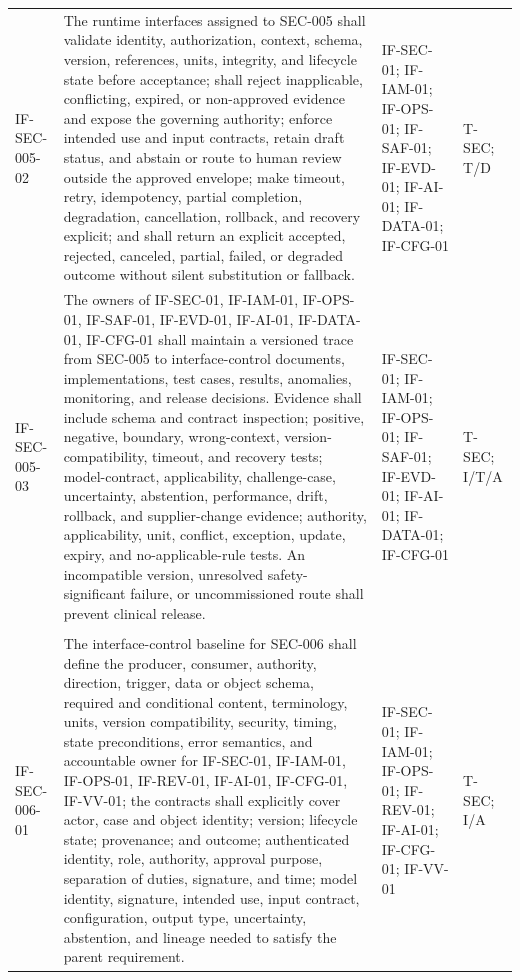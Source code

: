 \documentclass[11pt,letterpaper]{article}
\begin{document}
\begin{scriptsize}
\begin{longtable}{@{}L{0.14\textwidth}L{0.49\textwidth}L{0.19\textwidth}L{0.10\textwidth}@{}}
\addlinespace[2pt]
\mbox{IF-SEC-005-02} & The runtime interfaces assigned to SEC-005 shall validate identity, authorization, context, schema, version, references, units, integrity, and lifecycle state before acceptance; shall reject inapplicable, conflicting, expired, or non-approved evidence and expose the governing authority; enforce intended use and input contracts, retain draft status, and abstain or route to human review outside the approved envelope; make timeout, retry, idempotency, partial completion, degradation, cancellation, rollback, and recovery explicit; and shall return an explicit accepted, rejected, canceled, partial, failed, or degraded outcome without silent substitution or fallback. & IF-SEC-01; IF-IAM-01; IF-OPS-01; IF-SAF-01; IF-EVD-01; IF-AI-01; IF-DATA-01; IF-CFG-01 & T-SEC; T\slash\allowbreak{}D \\
\addlinespace[2pt]
\mbox{IF-SEC-005-03} & The owners of IF-SEC-01, IF-IAM-01, IF-OPS-01, IF-SAF-01, IF-EVD-01, IF-AI-01, IF-DATA-01, IF-CFG-01 shall maintain a versioned trace from SEC-005 to interface-control documents, implementations, test cases, results, anomalies, monitoring, and release decisions. Evidence shall include schema and contract inspection; positive, negative, boundary, wrong-context, version-compatibility, timeout, and recovery tests; model-contract, applicability, challenge-case, uncertainty, abstention, performance, drift, rollback, and supplier-change evidence; authority, applicability, unit, conflict, exception, update, expiry, and no-applicable-rule tests. An incompatible version, unresolved safety-significant failure, or uncommissioned route shall prevent clinical release. & IF-SEC-01; IF-IAM-01; IF-OPS-01; IF-SAF-01; IF-EVD-01; IF-AI-01; IF-DATA-01; IF-CFG-01 & T-SEC; I\slash\allowbreak{}T\slash\allowbreak{}A \\
\addlinespace[2pt]
 \\
\addlinespace[2pt]
\mbox{IF-SEC-006-01} & The interface-control baseline for SEC-006 shall define the producer, consumer, authority, direction, trigger, data or object schema, required and conditional content, terminology, units, version compatibility, security, timing, state preconditions, error semantics, and accountable owner for IF-SEC-01, IF-IAM-01, IF-OPS-01, IF-REV-01, IF-AI-01, IF-CFG-01, IF-VV-01; the contracts shall explicitly cover actor, case and object identity; version; lifecycle state; provenance; and outcome; authenticated identity, role, authority, approval purpose, separation of duties, signature, and time; model identity, signature, intended use, input contract, configuration, output type, uncertainty, abstention, and lineage needed to satisfy the parent requirement. & IF-SEC-01; IF-IAM-01; IF-OPS-01; IF-REV-01; IF-AI-01; IF-CFG-01; IF-VV-01 & T-SEC; I\slash\allowbreak{}A \\

\end{longtable}
\end{scriptsize}
\end{document}
